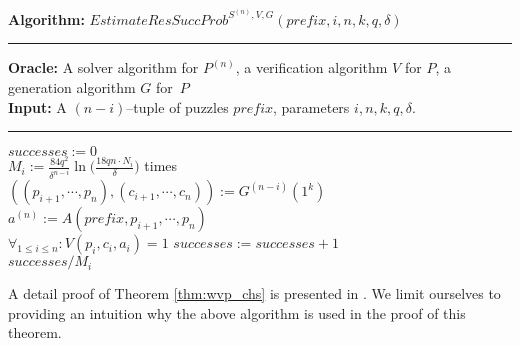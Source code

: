 %
\begin{codeblock}
  \textbf{Algorithm:} $\mathit{EstimateResSuccProb}^{S^{(n)},V, G}(\mathit{prefix}, i, n, k, q, \delta)$
  \medskip \hrule
  \textbf{Oracle:} A solver algorithm for $P^{(n)}$, a verification algorithm $V$ for $P$, a generation algorithm $G$ for~$P$\\
  \textbf{Input:} A $(n-i)$--tuple of puzzles $\mathit{prefix}$, parameters $i, n, k, q, \delta$.
  \medskip\hrule
  $successes := 0$ \\
  \Repeat $M_i := \frac{84q^2}{\delta^{n-i}} \ln \Big(\frac{18qn \cdot N_i}{\delta} \Big)$ times \\
  \IndI $((p_{i+1}, \cdots, p_n), (c_{i+1}, \cdots, c_n)) := G^{(n-i)}(1^k)$\\
  \IndI $a^{(n)} := A(\mathit{prefix}, p_{i+1}, \cdots, p_{n})$\\
  \IndI \If $\forall_{1 \leq i \leq n} : V(p_i, c_i, a_i) = 1$ \Then $\mathit{successes := successes + 1}$ \\
  \Return $successes / M_i$
\end{codeblock}
%
A detail proof of Theorem \ref{thm:wvp_chs} is presented in \cite{canetti2004hardness}.
We limit ourselves to providing an intuition why the above algorithm is used in the proof of this theorem.

